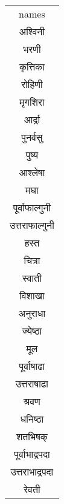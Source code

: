 \begin{table}
\begin{tabular}{c}
names\\
अश्विनी\\
भरणी\\
कृत्तिका\\
रोहिणी\\
मृगशिरा \\
आर्द्रा\\
पुनर्वसु\\
पुष्य\\
आश्लेषा\\
मघा\\
पूर्वाफाल्गुनी\\
उत्तराफाल्गुनी\\
हस्त\\
चित्रा\\
स्वाती \\
विशाखा\\
अनुराधा\\
ज्येष्ठा\\
मूल\\
पूर्वाषाढा\\
उत्तराषाढा\\
श्रवण\\
धनिष्ठा\\
शतभिषक्\\
पूर्वाभाद्रपदा\\
उत्तराभाद्रपदा\\
रेवती\\
\end{tabular} 
\end{table}

